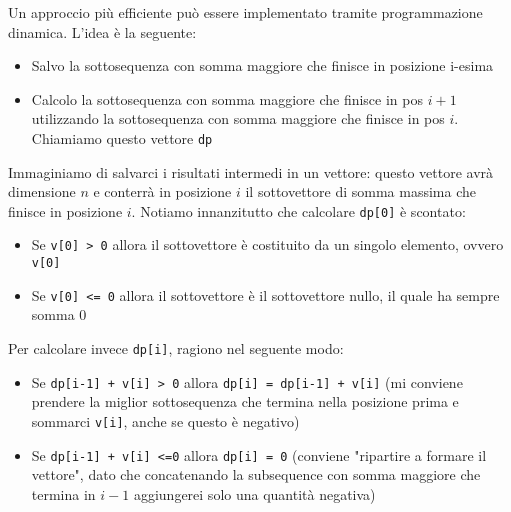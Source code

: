 Un approccio più efficiente può essere implementato tramite programmazione dinamica. L'idea è la seguente:
\begin{itemize}
	\item Salvo la sottosequenza con somma maggiore che finisce in posizione i-esima
	\item Calcolo la sottosequenza con somma maggiore che finisce in pos $ i+1 $ utilizzando la sottosequenza con somma maggiore che finisce in pos $ i $. Chiamiamo questo vettore \verb|dp|
\end{itemize}
Immaginiamo di salvarci i risultati intermedi in un vettore: questo vettore avrà dimensione $ n $ e conterrà in posizione $ i $ il sottovettore di somma massima che finisce in posizione $ i $. Notiamo innanzitutto che calcolare \verb|dp[0]| è scontato:
\begin{itemize}
	\item Se \verb|v[0] > 0| allora il sottovettore è costituito da un singolo elemento, ovvero \verb|v[0]|
	\item Se \verb|v[0] <= 0| allora il sottovettore è il sottovettore nullo, il quale ha sempre somma 0
\end{itemize}
Per calcolare invece \verb|dp[i]|, ragiono nel seguente modo:
\begin{itemize}
	\item Se \verb|dp[i-1] + v[i] > 0| allora \verb|dp[i] = dp[i-1] + v[i]| (mi conviene prendere la miglior sottosequenza che termina nella posizione prima e sommarci \verb|v[i]|, anche se questo è negativo)
	\item Se \verb|dp[i-1] + v[i] <=0| allora \verb|dp[i] = 0| (conviene "ripartire a formare il vettore", dato che concatenando la subsequence con somma maggiore che termina in $ i-1 $ aggiungerei solo una quantità negativa)
\end{itemize}
